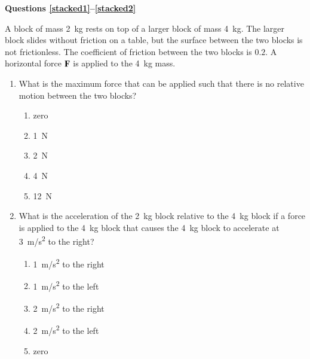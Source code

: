 \documentclass{../../../oss-apphys}
\begin{document}
\begin{multicols}{2}
\begin{enumerate}[resume,leftmargin=18pt]
  \end{enumerate}
  \columnbreak
  
  \textbf{Questions \ref{stacked1}--\ref{stacked2}}

  A block of mass \SI{2}{\kilo\gram} rests on top of a larger block of mass
  \SI{4}{\kilo\gram}. The larger block slides without friction on a table, but
  the surface between the two blocks is not frictionless. The coefficient of
  friction between the two blocks is $0.2$. A horizontal force $\mathbf{F}$ is
  applied to the \SI{4}{\kilo\gram} mass.
  \begin{enumerate}[resume,leftmargin=18pt]
  \item What is the maximum force that can be applied such that there is no
    relative motion between the two blocks?
    \begin{enumerate}[noitemsep,topsep=0pt,leftmargin=18pt,label=(\Alph*)]
    \item zero
    \item \SI{1}{\newton}
    \item \SI{2}{\newton}
    \item \SI{4}{\newton}
    \item \SI{12}{\newton}
    \end{enumerate}
    \label{stacked1}
    
  \item What is the acceleration of the \SI{2}{\kilo\gram} block relative to the
    \SI{4}{\kilo\gram} block if a force is applied to the \SI{4}{\kilo\gram}
    block that causes the \SI{4}{\kilo\gram} block to accelerate at
    \SI{3}{m/s^2} to the right?
    \begin{enumerate}[noitemsep,topsep=0pt,leftmargin=18pt,label=(\Alph*)]
    \item\SI{1}{m/s^2} to the right
    \item\SI{1}{m/s^2} to the left
    \item\SI{2}{m/s^2} to the right
    \item\SI{2}{m/s^2} to the left
    \item zero
    \end{enumerate}
    \label{stacked2}
  \end{enumerate}
\end{multicols}
\end{document}
